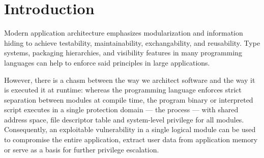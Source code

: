\documentclass[10pt,twocolumn,a4paper]{article}
\begin{document}
\section{Introduction}\label{intro}

%
%

Modern application architecture emphasizes modularization and information hiding to achieve testability, maintainability, exchangability, and reusability.
Type systems, packaging hierarchies, and visibility features in many programming languages can help to enforce said principles in large applications.

However, there is a chasm between the way we architect software and the way it is executed it at runtime:
whereas the programming language enforces strict separation between modules at compile time,
the program binary or interpreted script executes in a single protection domain --- the process ---
with shared address space, file descriptor table and system-level privilege for all modules.
Consequently, an exploitable vulnerability in a single logical module can be used to compromise the entire application, extract user data from application memory or serve as a basis for further privilege escalation.
\end{document}
